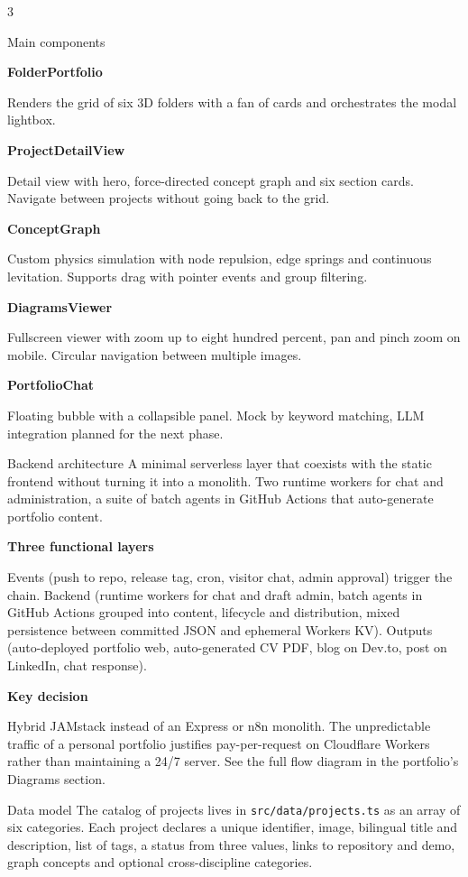 \documentclass[10pt]{article}
\newcommand{\posterheading}[1]{%
  \vspace{4pt}%
  \par{\color{accentdark}\sffamily\bfseries #1}\par
  \vspace{2pt}%
}
\begin{document}
\begin{multicols}{3}
\begin{posterblock}{Main components}
\posterheading{FolderPortfolio}
Renders the grid of six 3D folders with a fan of cards and orchestrates the modal lightbox.

\posterheading{ProjectDetailView}
Detail view with hero, force-directed concept graph and six section cards. Navigate between projects without going back to the grid.

\posterheading{ConceptGraph}
Custom physics simulation with node repulsion, edge springs and continuous levitation. Supports drag with pointer events and group filtering.

\posterheading{DiagramsViewer}
Fullscreen viewer with zoom up to eight hundred percent, pan and pinch zoom on mobile. Circular navigation between multiple images.

\posterheading{PortfolioChat}
Floating bubble with a collapsible panel. Mock by keyword matching, LLM integration planned for the next phase.
\end{posterblock}


\begin{posterblock}{Backend architecture}
A minimal serverless layer that coexists with the static frontend without turning it into a monolith. Two runtime workers for chat and administration, a suite of batch agents in GitHub Actions that auto-generate portfolio content.

\posterheading{Three functional layers}
Events (push to repo, release tag, cron, visitor chat, admin approval) trigger the chain. Backend (runtime workers for chat and draft admin, batch agents in GitHub Actions grouped into content, lifecycle and distribution, mixed persistence between committed JSON and ephemeral Workers KV). Outputs (auto-deployed portfolio web, auto-generated CV PDF, blog on Dev.to, post on LinkedIn, chat response).

\posterheading{Key decision}
Hybrid JAMstack instead of an Express or n8n monolith. The unpredictable traffic of a personal portfolio justifies pay-per-request on Cloudflare Workers rather than maintaining a 24/7 server. See the full flow diagram in the portfolio's Diagrams section.
\end{posterblock}

\begin{posterblock}{Data model}
The catalog of projects lives in \texttt{src/data/projects.ts} as an array of six categories. Each project declares a unique identifier, image, bilingual title and description, list of tags, a status from three values, links to repository and demo, graph concepts and optional cross-discipline categories.


\end{posterblock}
\end{multicols}
\end{document}
